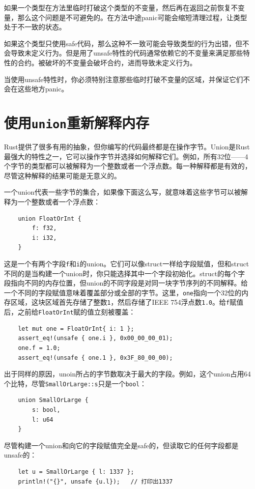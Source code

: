 如果一个类型在方法里临时打破这个类型的不变量，然后再在返回之前恢复不变量，那么这个问题是不可避免的。在方法中途panic可能会缩短清理过程，让类型处于不一致的状态。

如果这个类型只使用safe代码，那么这种不一致可能会导致类型的行为出错，但不会导致未定义行为。但是用了unsafe特性的代码通常依赖它的不变量来满足那些特性的合约。被破坏的不变量会破坏合约，进而导致未定义行为。

当使用unsafe特性时，你必须特别注意那些临时打破不变量的区域，并保证它们不会在这些地方panic。

\section{使用\texttt{union}重新解释内存}

Rust提供了很多有用的抽象，但你编写的代码最终都是在操作字节。Union是Rust最强大的特性之一，它可以操作字节并选择如何解释它们。例如，所有32位——4个字节的类型都可以被解释为一个整数或者一个浮点数。每一种解释都是有效的，尽管这种解释的结果可能是无意义的。

一个union代表一些字节的集合，如果像下面这么写，就意味着这些字节可以被解释为一个整数或者一个浮点数：
\begin{verbatim}
    union FloatOrInt {
        f: f32,
        i: i32,
    }
\end{verbatim}

这是一个有两个字段\texttt{f}和\texttt{i}的union。它们可以像struct一样给字段赋值，但和struct不同的是当构建一个union时，你只能选择其中一个字段初始化。struct的每个字段指向不同的内存位置，但union的不同字段是对同一块字节序列的不同解释。给一个不同的字段赋值意味着覆盖部分或全部的字节。这里，\texttt{one}指向一个32位的内存区域，这块区域首先存储了整数\texttt{1}，然后存储了IEEE 754浮点数\texttt{1.0}。给\texttt{f}赋值后，之前给\texttt{FloatOrInt}赋的值立刻被覆盖：
\begin{verbatim}
    let mut one = FloatOrInt{ i: 1 };
    assert_eq!(unsafe { one.i }, 0x00_00_00_01);
    one.f = 1.0;
    assert_eq!(unsafe { one.1 }, 0x3F_80_00_00);
\end{verbatim}

出于同样的原因，unoin所占的字节数取决于最大的字段。例如，这个union占用64个比特，尽管\texttt{SmallOrLarge::s}只是一个\texttt{bool}：
\begin{verbatim}
    union SmallOrLarge {
        s: bool,
        l: u64
    }
\end{verbatim}

尽管构建一个union和向它的字段赋值完全是safe的，但读取它的任何字段都是unsafe的：
\begin{verbatim}
    let u = SmallOrLarge { l: 1337 };
    println!("{}", unsafe {u.l});   // 打印出1337
\end{verbatim}

